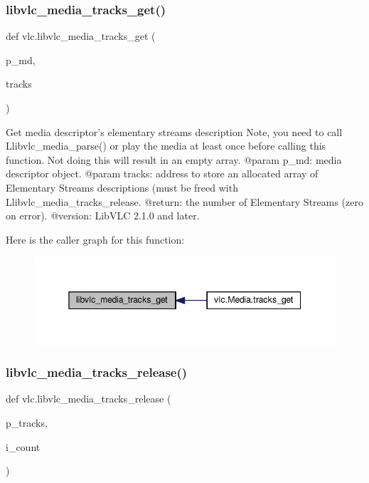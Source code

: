 \subsubsection{\texorpdfstring{libvlc\+\_\+media\+\_\+tracks\+\_\+get()}{libvlc\_media\_tracks\_get()}}
{\footnotesize\ttfamily def vlc.\+libvlc\+\_\+media\+\_\+tracks\+\_\+get (\begin{DoxyParamCaption}\item[{}]{p\+\_\+md,  }\item[{}]{tracks }\end{DoxyParamCaption})}

\begin{DoxyVerb}Get media descriptor's elementary streams description
Note, you need to call L{libvlc_media_parse}() or play the media at least once
before calling this function.
Not doing this will result in an empty array.
@param p_md: media descriptor object.
@param tracks: address to store an allocated array of Elementary Streams descriptions (must be freed with L{libvlc_media_tracks_release}.
@return: the number of Elementary Streams (zero on error).
@version: LibVLC 2.1.0 and later.
\end{DoxyVerb}
 Here is the caller graph for this function\+:
\nopagebreak
\begin{figure}[H]
\begin{center}
\leavevmode
\includegraphics[width=345pt]{namespacevlc_a0698f7a1ab5f3f3c2d408c42530720dc_icgraph}
\end{center}
\end{figure}
\mbox{\label{namespacevlc_a4fbc816f9ca8c1b1033c24404d555e23}} 
\subsubsection{\texorpdfstring{libvlc\+\_\+media\+\_\+tracks\+\_\+release()}{libvlc\_media\_tracks\_release()}}
{\footnotesize\ttfamily def vlc.\+libvlc\+\_\+media\+\_\+tracks\+\_\+release (\begin{DoxyParamCaption}\item[{}]{p\+\_\+tracks,  }\item[{}]{i\+\_\+count }\end{DoxyParamCaption})}

